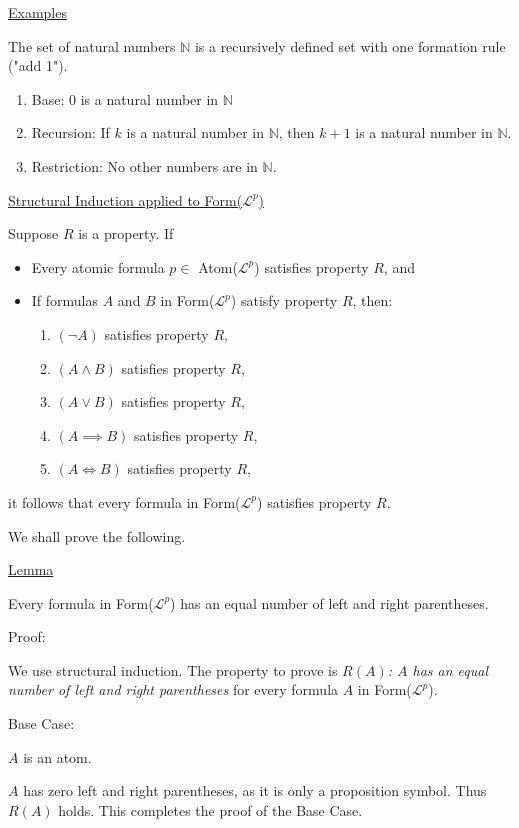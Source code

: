 \documentclass{article}
\begin{document}
\underline{Examples}

The set of natural numbers $\mathbb{N}$ is a recursively defined set with one formation rule ("add 1"). 
\begin{enumerate}
    \item Base: $0$ is a natural number in $\mathbb{N}$
    \item Recursion: If $k$ is a natural number in $\mathbb{N}$, then $k+1$ is a natural number in $\mathbb{N}$.
    \item Restriction: No other numbers are in $\mathbb{N}$. 
\end{enumerate}

\underline{Structural Induction applied to Form($\mathcal{L}^p$)}

Suppose $R$ is a property. If
\begin{itemize}
    \item Every atomic formula $p \in$ Atom($\mathcal{L}^p$) satisfies property $R$, and
    \item If formulas $A$ and $B$ in Form($\mathcal{L}^p$) satisfy property $R$, then:
    \begin{enumerate}
        \item $(\neg A)$ satisfies property $R$,
        \item $(A \wedge B)$ satisfies property $R$,
        \item $(A \vee B)$ satisfies property $R$,
        \item $(A \implies B)$ satisfies property $R$,
        \item $(A \iff B)$ satisfies property $R$,
    \end{enumerate}
\end{itemize}
it follows that every formula in Form($\mathcal{L}^p$) satisfies property $R$. 

We shall prove the following. 

\underline{Lemma}

Every formula in Form($\mathcal{L}^p$) has an equal number of left and right parentheses. 

Proof:

We use structural induction. The property to prove is \textit{$R(A)$: $A$ has an equal number of left and right parentheses} for every formula $A$ in Form($\mathcal{L}^p$). 

Base Case: 

$A$ is an atom. 

$A$ has zero left and right parentheses, as it is only a proposition symbol. Thus $R(A)$ holds. This completes the proof of the Base Case. 
\end{document}
